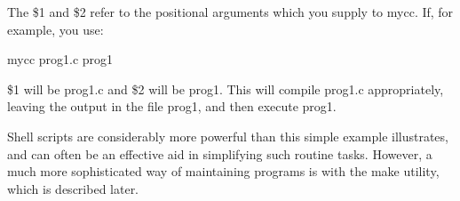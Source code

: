      The {\cmd \$1}  and {\cmd \$2}  refer to the positional
arguments which you supply to {\cmd mycc}. If, for example, you use:
\begin{display}\cmd
mycc prog1.c prog1
\end{display}
\noindent
     {\cmd \$1} will  be {\cmd prog1.c}  and {\cmd \$2}  will be  {\cmd
prog1}. This  will  compile  {\cmd prog1.c} appropriately, leaving the
output in the file {\cmd prog1}, and then execute {\cmd prog1}.

     Shell scripts  are considerably  more powerful  than this  simple
example illustrates, and  can often  be an  effective aid  in
simplifying such routine tasks.  However, a much more sophisticated
way of maintaining programs is with the {\cmd make} utility, which is
described later.

